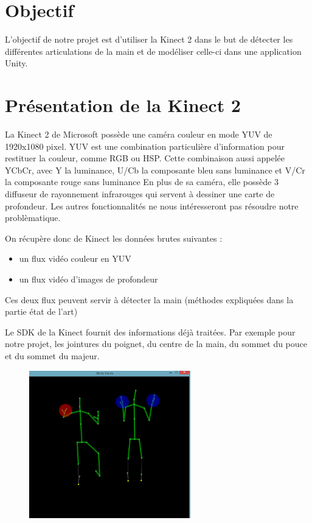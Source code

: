 \section{Objectif}
L'objectif de notre projet est d'utiliser la Kinect 2 dans le but de détecter les différentes articulations
de la main et de modéliser celle-ci dans une application Unity.

\section{Présentation de la Kinect 2}
La Kinect 2 de Microsoft possède une caméra couleur en mode YUV de 1920x1080 pixel.
YUV est une combination particulière d'information pour restituer la couleur, comme RGB ou HSP.
Cette combinaison aussi appelée YCbCr, avec Y la luminance, U/Cb la composante bleu sans luminance et V/Cr la composante rouge sans luminance
En plus de sa caméra, elle possède 3 diffuseur de rayonnement infrarouges qui servent à dessiner une carte de profondeur.
Les autres fonctionnalités ne nous intéresseront pas résoudre notre problèmatique.

On récupère donc de Kinect les données brutes suivantes : 
\begin{itemize}
 \item un flux vidéo couleur en YUV
 \item un flux vidéo d'images de profondeur
\end{itemize}

Ces deux flux peuvent servir à détecter la main (méthodes expliquées dans la partie état de l'art)

Le SDK de la Kinect fournit des informations déjà traitées. 
Par exemple pour notre projet, les jointures du poignet, du centre de la main, du sommet du pouce et du sommet du majeur.

\begin{figure}[!h]
\includegraphics[width=7cm]{images/kinec2_skel.png}
\end{figure}


